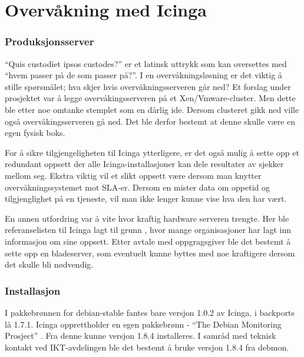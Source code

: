 \section{Overvåkning med Icinga}
\subsubsection{Produksjonsserver}
“Quis custodiet ipsos custodes?” er et latinsk uttrykk som kan oversettes med “hvem passer på de som passer på?”. I en overvåkningsløsning er det viktig å stille spørsmålet; hva skjer hvis overvåkningsserveren går ned? Et forslag under prosjektet var å legge overvåkingsserveren på et Xen/Vmware-cluster. Men dette ble etter noe omtanke stemplet som en dårlig ide. Dersom clusteret gikk ned ville også overvåkingsserveren gå ned. Det ble derfor bestemt at denne skulle være en egen fysisk boks. 

For å sikre tilgjengeligheten til Icinga ytterligere, er det også mulig å sette opp et redundant oppsett der alle Icinga-installasjoner kan dele resultater av sjekker mellom seg. Ekstra viktig vil et slikt oppsett være dersom man knytter overvåkningssystemet mot SLA-er. Dersom en mister data om oppetid og tilgjenglighet på en tjeneste, vil man ikke lenger kunne vise hva den har vært.

En annen utfordring var å vite hvor kraftig hardware serveren trengte. Her ble referanselisten til Icinga lagt til grunn \cite{icingainaction}, hvor mange organisasjoner har lagt inn informasjon om sine oppsett. Etter avtale med oppgragsgiver ble det bestemt å sette opp en bladeserver, som eventuelt kunne byttes med noe kraftigere dersom det skulle bli nødvendig. 

\subsubsection{Installasjon}
I pakkebrønnen for debian-stable fantes bare versjon 1.0.2 av Icinga, i backports lå 1.7.1. Icinga opprettholder en egen pakkebrønn - “The Debian Monitoring Prosject” \cite{debmon}. Fra denne kunne versjon 1.8.4 installeres. I samråd med teknisk kontakt ved IKT-avdelingen ble det bestemt å bruke versjon 1.8.4 fra debmon.

